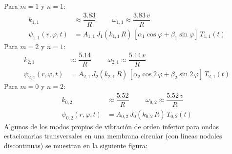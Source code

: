 Para $m = 1$ y $n = 1$:
\begin{align*}
k_{1,1} &\approx \dfrac{3.83}{R} \hspace{1cm} \omega_{1,1} \approx \dfrac{3.83 \, v}{R} \\
\psi_{1,1} (r,\varphi,t) &= A_{1,1} \, J_{1}(k_{1,1} \, R) \, [\alpha_{1}\cos \varphi + \beta_{1} \sin \varphi ] \, T_{1,1} (t)
\end{align*}
Para $m = 2$ y $n = 1$:
\begin{align*}
k_{2,1} &\approx \dfrac{5.14}{R} \hspace{1cm} \omega_{2,1} \approx \dfrac{5.14 \, v}{R} \\
\psi_{2,1} (r,\varphi,t) &= A_{2,1} \, J_{2}(k_{2,1} \, R) \, [\alpha_{2}\cos 2 \,\varphi + \beta_{2} \sin 2 \, \varphi ] \, T_{2,1} (t)
\end{align*}
Para $m = 0$ y $n = 2$:
\begin{align*}
k_{0,2} &\approx \dfrac{5.52}{R} \hspace{1cm} \omega_{0,2} \approx \dfrac{5.52 \, v}{R} \\
\psi_{0,2} (r,\varphi,t) &= A_{0,2} \, J_{0}(k_{0,2} \, R) \, T_{0,2} (t)
\end{align*}
Algunos de los modos propios de vibración de orden inferior para ondas estacionarias transversales en una membrana circular (con líneas nodales discontinuas) se muestran en la siguiente figura:
\newpage
